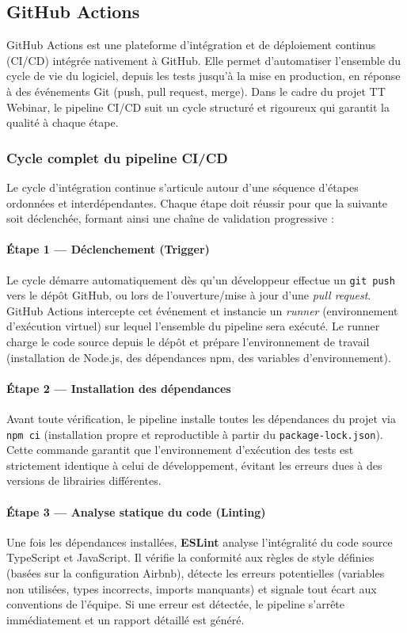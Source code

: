\subsection{GitHub Actions}

GitHub Actions est une plateforme d'intégration et de déploiement continus (CI/CD) intégrée
nativement à GitHub. Elle permet d'automatiser l'ensemble du cycle de vie du logiciel, depuis
les tests jusqu'à la mise en production, en réponse à des événements Git (push, pull request,
merge). Dans le cadre du projet TT Webinar, le pipeline CI/CD suit un cycle structuré et
rigoureux qui garantit la qualité à chaque étape.

\subsubsection{Cycle complet du pipeline CI/CD}

Le cycle d'intégration continue s'articule autour d'une séquence d'étapes ordonnées et
interdépendantes. Chaque étape doit réussir pour que la suivante soit déclenchée, formant
ainsi une chaîne de validation progressive :

\paragraph{Étape 1 — Déclenchement (Trigger)}
Le cycle démarre automatiquement dès qu'un développeur effectue un \texttt{git push} vers
le dépôt GitHub, ou lors de l'ouverture/mise à jour d'une \textit{pull request}. GitHub
Actions intercepte cet événement et instancie un \textit{runner} (environnement d'exécution
virtuel) sur lequel l'ensemble du pipeline sera exécuté. Le runner charge le code source
depuis le dépôt et prépare l'environnement de travail (installation de Node.js, des
dépendances npm, des variables d'environnement).

\paragraph{Étape 2 — Installation des dépendances}
Avant toute vérification, le pipeline installe toutes les dépendances du projet via
\texttt{npm ci} (installation propre et reproductible à partir du \texttt{package-lock.json}).
Cette commande garantit que l'environnement d'exécution des tests est strictement identique
à celui de développement, évitant les erreurs dues à des versions de librairies différentes.

\paragraph{Étape 3 — Analyse statique du code (Linting)}
Une fois les dépendances installées, \textbf{ESLint} analyse l'intégralité du code source
TypeScript et JavaScript. Il vérifie la conformité aux règles de style définies (basées sur
la configuration Airbnb), détecte les erreurs potentielles (variables non utilisées, types
incorrects, imports manquants) et signale tout écart aux conventions de l'équipe. Si une
erreur est détectée, le pipeline s'arrête immédiatement et un rapport détaillé est généré.

